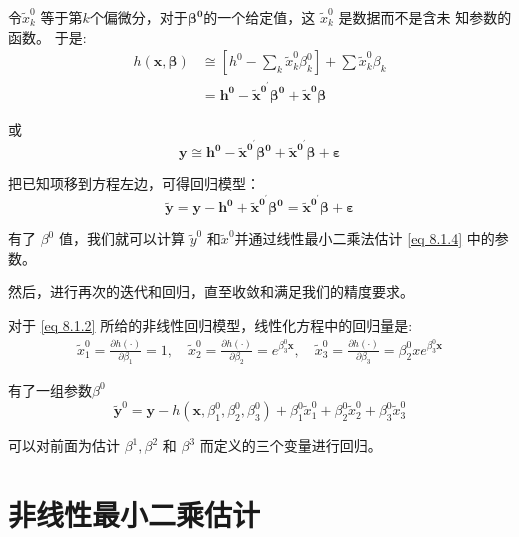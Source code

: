 令$ \tilde{x}_{k}^{0} $ 等于第$ k $个偏微分，对于$ \boldsymbol{\beta^{0}} $的一个给定值，这 $ \tilde{x}_{k}^{0} $ 是数据而不是含未
知参数的函数。 于是:
$$ \begin{aligned}
    h(\boldsymbol{x, \beta}) & \cong \left[h^{0}-\sum_{k} \tilde{x}_{k}^{0} \beta_{k}^{0}\right]+\sum \tilde{x}_{k}^{0} \beta_{k} \\
    & = \boldsymbol{ h^{0}-\tilde{x}^{0^{\prime}} \beta^{0}+\tilde{x}^{0} \beta }
    \end{aligned} $$

或
$$ \boldsymbol{ y \cong h^{0}-\widetilde{x}^{0^{\prime}} \beta^{0}+\tilde{x}^{0^{\prime}} \beta+\varepsilon } $$

把已知项移到方程左边，可得回归模型：
\begin{equation}
    \boldsymbol{ \tilde{y}=y-h^{0}+\widetilde{x}^{0^{\prime}} \beta^{0}=\tilde{x}^{0^{\prime}} \beta+\varepsilon }
    \label{eq 8.1.4}
\end{equation}

有了 $\beta^{0}$ 值，我们就可以计算 $ \tilde{y}^{0} $ 和$ \tilde{x}^{0} $并通过线性最小二乘法估计 \ref{eq 8.1.4} 中的参数。

然后，进行再次的迭代和回归，直至收敛和满足我们的精度要求。

\begin{myexample}
    对于 \ref{eq 8.1.2} 所给的非线性回归模型，线性化方程中的回归量是:
    $$ \begin{array}{c}
            \tilde{x}_{1}^{0}=\frac{\partial h(\cdot)}{\partial \beta_{1}}=1, \quad 
            \tilde{x}_{2}^{0}=\frac{\partial h(\cdot)}{\partial \beta_{2}}=e^{\beta_{3}^{0} \boldsymbol{x}}, \quad  
            \tilde{x}_{3}^{0}=\frac{\partial h(\cdot)}{\partial \beta_{3}}=\beta_{2}^{0} x e^{\beta_{3}^{0} \boldsymbol{x}}
        \end{array} $$
    
    有了一组参数$ \beta^{0} $
    $$ \tilde{\boldsymbol{y}}^{0} = \boldsymbol{y}-h \left(\boldsymbol{x}, \beta_{1}^{0}, \beta_{2}^{0}, 
        \beta_{3}^{0}\right)+\beta_{1}^{0} \widetilde{x}_{1}^{0}+\beta_{2}^{0} 
        \widetilde{x}_{2}^{0}+\beta_{3}^{0} \widetilde{x}_{3}^{0} $$

    可以对前面为估计 $ \beta^{1}, \beta^{2} $ 和 $ \beta^{3} $ 而定义的三个变量进行回归。
\end{myexample}

\section{非线性最小二乘估计}

